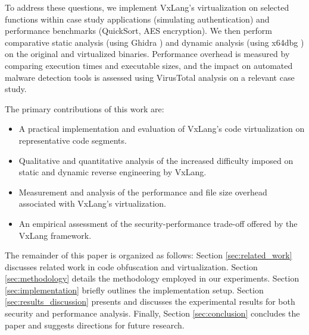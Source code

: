 To address these questions, we implement VxLang's virtualization on selected functions within case study applications (simulating authentication) and performance benchmarks (QuickSort, AES encryption). We then perform comparative static analysis (using Ghidra \cite{Nat19}) and dynamic analysis (using x64dbg \cite{Dun14}) on the original and virtualized binaries. Performance overhead is measured by comparing execution times and executable sizes, and the impact on automated malware detection tools is assessed using VirusTotal analysis on a relevant case study.

The primary contributions of this work are:
\begin{itemize}
    \item A practical implementation and evaluation of VxLang's code virtualization on representative code segments.
    \item Qualitative and quantitative analysis of the increased difficulty imposed on static and dynamic reverse engineering by VxLang.
    \item Measurement and analysis of the performance and file size overhead associated with VxLang's virtualization.
    \item An empirical assessment of the security-performance trade-off offered by the VxLang framework.
\end{itemize}

The remainder of this paper is organized as follows: Section \ref{sec:related_work} discusses related work in code obfuscation and virtualization. Section \ref{sec:methodology} details the methodology employed in our experiments. Section \ref{sec:implementation} briefly outlines the implementation setup. Section \ref{sec:results_discussion} presents and discusses the experimental results for both security and performance analysis. Finally, Section \ref{sec:conclusion} concludes the paper and suggests directions for future research.
